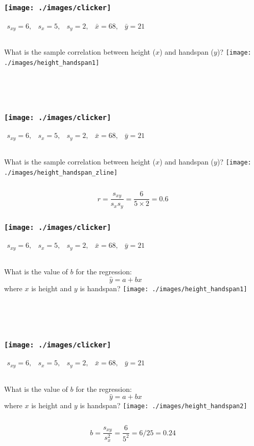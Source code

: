 \begin{frame}
\frametitle{\texttt{[image: ./images/clicker]}}

$\begin{array}{ccccc} s_{xy} = 6,&s_x = 5,& s_y = 2,& \bar{x} = 68,& \bar{y} = 21\end{array}$
\begin{columns}[c]
\column{2.5in}
What is the sample correlation between height ($x$) and handspan ($y$)?
\column{1.8in}
\texttt{[image: ./images/height\_handspan1]}
\end{columns}
\alert{$$\phantom{r = \frac{s_{xy}}{s_x s_y} = \frac{6}{4.5\times 2.2} \approx 0.6}$$}
\end{frame}
\begin{frame}
\frametitle{\texttt{[image: ./images/clicker]}}
$\begin{array}{ccccc} s_{xy} = 6,&s_x = 5,& s_y = 2,& \bar{x} = 68,& \bar{y} = 21\end{array}$
\begin{columns}[c]
\column{2.5in}
What is the sample correlation between height ($x$) and handspan ($y$)?
\column{1.8in}
\texttt{[image: ./images/height\_handspan\_zline]}
\end{columns}
\alert{$$r = \frac{s_{xy}}{s_x s_y} = \frac{6}{5\times 2} = 0.6$$}
\end{frame}
\begin{frame}
\frametitle{\texttt{[image: ./images/clicker]}}
$\begin{array}{ccccc} s_{xy} = 6,&s_x = 5,& s_y = 2,& \bar{x} = 68,& \bar{y} = 21\end{array}$
\begin{columns}[c]
\column{2.5in}
What is the value of $b$ for the regression: $$\hat{y}=a+bx$$
where $x$ is height and $y$ is handspan?
\column{1.8in}
\texttt{[image: ./images/height\_handspan1]}
\end{columns}
\alert{$$\phantom{b = \frac{s_{xy}}{s_x^2} = \frac{6}{(4.5)^2} = 6/20.25 \approx 0.3}$$}
\end{frame}
\begin{frame}
\frametitle{\texttt{[image: ./images/clicker]}}
$\begin{array}{ccccc} s_{xy} = 6,&s_x = 5,& s_y = 2,& \bar{x} = 68,& \bar{y} = 21\end{array}$
\begin{columns}[c]
\column{2.5in}
What is the value of $b$ for the regression: $$\hat{y}=a+bx$$
where $x$ is height and $y$ is handspan?
\column{1.8in}
\texttt{[image: ./images/height\_handspan2]}
\end{columns}
\alert{$$b = \frac{s_{xy}}{s_x^2} = \frac{6}{5^2} = 6/25 = 0.24 $$}
\end{frame}
